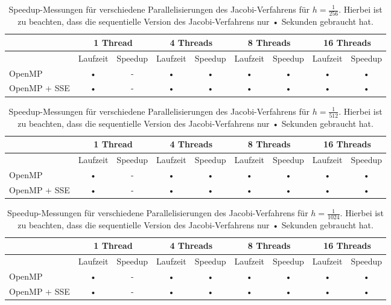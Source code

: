\documentclass{article}
\begin{document}
\begin{table}[h!]
\small
\begin{tabular}{p{1.5cm}|c|c|c|c|c|c|c|c}
 & \multicolumn{2}{c|}{1 Thread} & \multicolumn{2}{c|}{4 Threads} & \multicolumn{2}{c|}{8 Threads} & \multicolumn{2}{|c}{16 Threads} \\ 
\hline 
 & Laufzeit & Speedup & Laufzeit & Speedup & Laufzeit & Speedup & Laufzeit & Speedup \\ 
\hline 
OpenMP & • & - & • & • & • & • & • & • \\ 
\hline
OpenMP + SSE & • & - & • & • & • & • & • & • \\ 
\hline 
\end{tabular}
\caption{Speedup-Messungen für verschiedene Parallelisierungen des Jacobi-Verfahrens für $h=\frac{1}{256}$. Hierbei ist zu beachten, dass die sequentielle Version des Jacobi-Verfahrens nur • Sekunden gebraucht hat.}
\end{table}

\begin{table}[h!]
\small
\begin{tabular}{p{1.5cm}|c|c|c|c|c|c|c|c}
 & \multicolumn{2}{c|}{1 Thread} & \multicolumn{2}{c|}{4 Threads} & \multicolumn{2}{c|}{8 Threads} & \multicolumn{2}{|c}{16 Threads} \\ 
\hline 
 & Laufzeit & Speedup & Laufzeit & Speedup & Laufzeit & Speedup & Laufzeit & Speedup \\ 
\hline 
OpenMP & • & - & • & • & • & • & • & • \\ 
\hline
OpenMP + SSE & • & - & • & • & • & • & • & • \\ 
\hline 
\end{tabular}
\caption{Speedup-Messungen für verschiedene Parallelisierungen des Jacobi-Verfahrens für $h=\frac{1}{512}$. Hierbei ist zu beachten, dass die sequentielle Version des Jacobi-Verfahrens nur • Sekunden gebraucht hat.}
\end{table}

\begin{table}[h!]
\small
\begin{tabular}{p{1.5cm}|c|c|c|c|c|c|c|c}
 & \multicolumn{2}{c|}{1 Thread} & \multicolumn{2}{c|}{4 Threads} & \multicolumn{2}{c|}{8 Threads} & \multicolumn{2}{|c}{16 Threads} \\ 
\hline 
 & Laufzeit & Speedup & Laufzeit & Speedup & Laufzeit & Speedup & Laufzeit & Speedup \\ 
\hline 
OpenMP & • & - & • & • & • & • & • & • \\ 
\hline
OpenMP + SSE & • & - & • & • & • & • & • & • \\ 
\hline 
\end{tabular}
\caption{Speedup-Messungen für verschiedene Parallelisierungen des Jacobi-Verfahrens für $h=\frac{1}{1024}$. Hierbei ist zu beachten, dass die sequentielle Version des Jacobi-Verfahrens nur • Sekunden gebraucht hat.}
\end{table}
\end{document}
